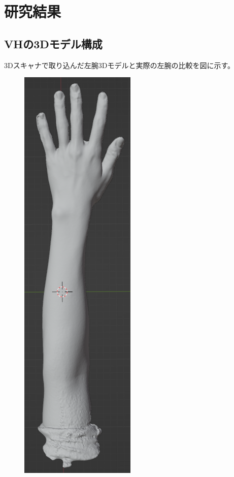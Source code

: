 \documentclass{ltjsreport}
\begin{document}
\chapter{研究結果}
	
	\section{VHの3Dモデル構成}
		3Dスキャナで取り込んだ左腕3Dモデルと実際の左腕の比較を図に示す。

		\begin{figure}[H]
		\centering
		\begin{minipage}{0.11\columnwidth}
		\centering
		\includegraphics[width = \columnwidth]{../figs/SmoothingBeforALL.png}

\end{minipage}
\end{figure}
\end{document}
